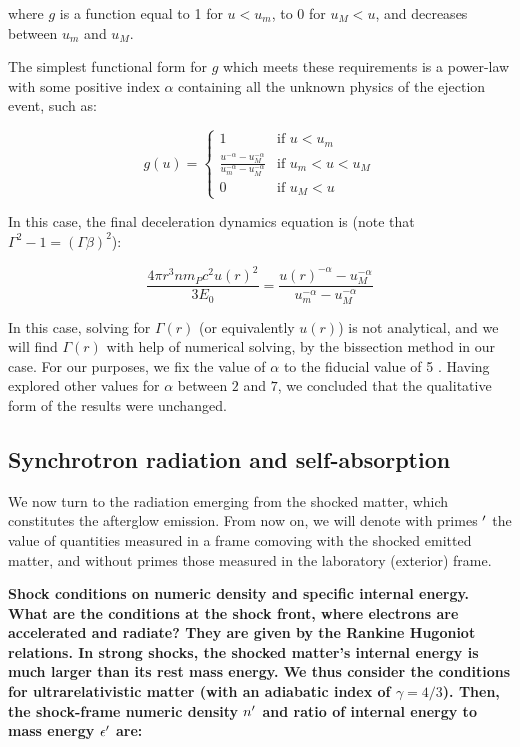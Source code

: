 where $g$ is a function equal to 1 for $u < u_m$, to 0 for $u_M < u$, and decreases between $u_m$ and $u_M$.

The simplest functional form for $g$ which meets these requirements is a power-law with some positive index $\alpha$ containing all the unknown physics of the ejection event, such as:

\begin{equation}
    g(u) = \left \{ \begin{array}{cl}
    1 & \text{if } u < u_m \\
    \frac{u ^ {-\alpha} - u_M^{-\alpha}}{u_m ^ {-\alpha} - u_M ^ {-\alpha}} & \text{if } u_m < u < u_M \\
    0 & \text{if } u_M < u
\end{array}
    \end{equation}

In this case, the final deceleration dynamics equation is (note that $\Gamma^2 - 1 = (\Gamma\beta)^2$):

\begin{equation}\frac{4\pi r^3 n m_P c^2u(r)^2}{3 E_0} = \frac{u(r) ^ {-\alpha} - u_M^{-\alpha}}{u_m ^ {-\alpha} - u_M ^ {-\alpha}} \end{equation}

In this case, solving for $\Gamma(r)$ (or equivalently $u(r)$) is not analytical, and we will find $\Gamma(r)$ with help of numerical solving, by the bissection method in our case. For our purposes, we fix the value of $\alpha$ to the fiducial value of 5 \citep{13}. Having explored other values for $\alpha$ between $2$ and $7$, we concluded that the qualitative form of the results were unchanged.

\subsection{Synchrotron radiation and self-absorption}
We now turn to the radiation emerging from the shocked matter, which constitutes the afterglow emission. From now on, we will denote with primes $^{\prime}$ the value of quantities measured in a frame comoving with the shocked emitted matter, and without primes those measured in the laboratory (exterior) frame.

\bf{Shock conditions on numeric density and specific internal energy. }What are the conditions at the shock front, where electrons are accelerated and radiate? They are given by the Rankine Hugoniot \citep[e.g][chap. 15]{39} relations. In strong shocks, the shocked matter's internal energy is much larger than its rest mass energy. We thus consider the conditions for ultrarelativistic matter (with an adiabatic index of $\gamma = 4/3$). Then, the shock-frame numeric density $n^{\prime}$ and ratio of internal energy to mass energy $\epsilon^{\prime}$ are:

